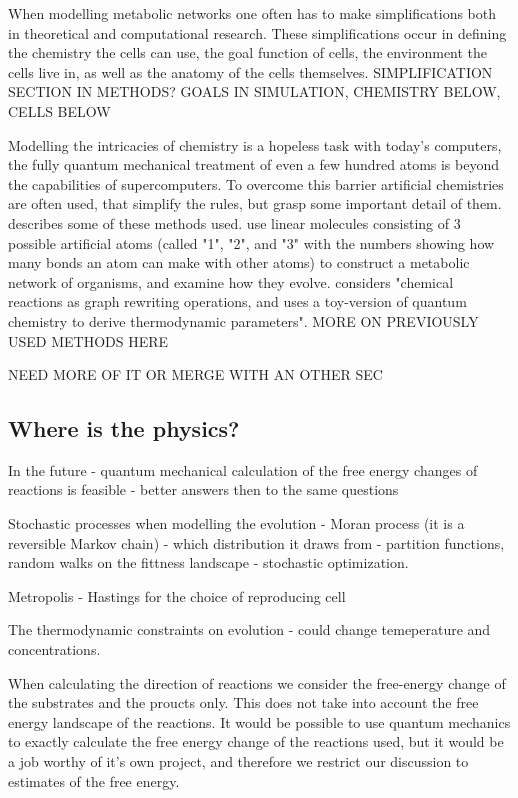 \documentclass[10pt,a4paper]{article}
\begin{document}
	When modelling metabolic networks one often has to make simplifications both in theoretical and computational research. These simplifications occur in defining the chemistry the cells can use, the goal function of cells, the environment the cells live in, as well as the anatomy of the cells themselves. SIMPLIFICATION SECTION IN METHODS? GOALS IN SIMULATION, CHEMISTRY BELOW, CELLS BELOW
	
	Modelling the intricacies of chemistry is a hopeless task with today's computers, the fully quantum mechanical treatment of even a few hundred atoms is beyond the capabilities of supercomputers. To overcome this barrier artificial chemistries are often used, that simplify the rules, but grasp some important detail of them. \citeauthor{artificialreview} describes some of these methods used. \citeauthor{evolutioncomplex} use linear molecules consisting of 3 possible  artificial atoms (called "1", "2", and "3" with the numbers showing how many bonds an atom can make with other atoms) to construct a metabolic network of organisms, and examine how they evolve. \citeauthor{computationalframework} considers "chemical reactions as graph rewriting operations, and uses a toy-version of quantum chemistry to derive thermodynamic parameters". MORE ON PREVIOUSLY USED METHODS HERE
	
	NEED MORE OF IT OR MERGE WITH AN OTHER SEC

	
	\subsection{Where is the physics?}\label{chap:whereisphysics}

	In the future - quantum mechanical calculation of the free energy changes of reactions is feasible - better answers then to the same questions

	Stochastic processes when modelling the evolution - Moran process  (it is a reversible Markov chain) - which distribution it draws from - partition functions, random walks on the fittness landscape - stochastic optimization. 

	Metropolis - Hastings for the choice of reproducing cell
	
	The thermodynamic constraints on evolution - could change temeperature and concentrations. 

	
	
	When calculating the direction of reactions we consider the free-energy change of the substrates and the proucts only. This does not take into account the free energy landscape of the reactions. It would be possible to use quantum mechanics to exactly calculate the free energy change of the reactions used, but it would be a job worthy of it's own project, and therefore we restrict our discussion to estimates of the free energy.
	
\end{document}
